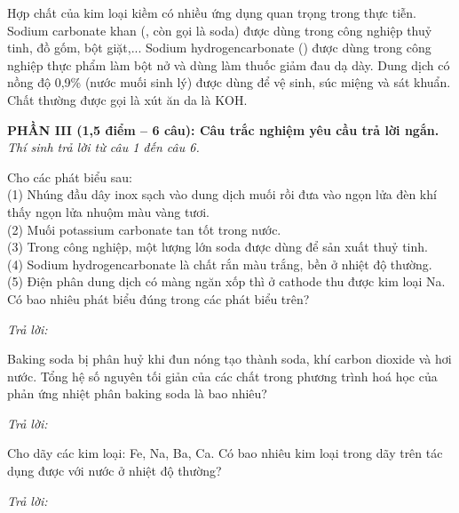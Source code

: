 \documentclass[11pt,a4paper]{article}
\def\loigiai#1{}
\begin{document}
\begin{ex}
Hợp chất của kim loại kiềm có nhiều ứng dụng quan trọng trong thực tiễn.
\choiceTF
{Sodium carbonate khan (, còn gọi là soda) được dùng trong công nghiệp thuỷ tinh, đồ gốm, bột giặt,...}
{Sodium hydrogencarbonate () được dùng trong công nghiệp thực phẩm làm bột nở và dùng làm thuốc giảm đau dạ dày.}
{Dung dịch  có nồng độ 0,9\% (nước muối sinh lý) được dùng để vệ sinh, súc miệng và sát khuẩn.}
{Chất thường được gọi là xút ăn da là KOH.}
\loigiai{}
\end{ex}

\newpage

\noindent
\textbf{PHẦN III (1,5 điểm -- 6 câu): Câu trắc nghiệm yêu cầu trả lời ngắn.}\\
\textit{Thí sinh trả lời từ câu 1 đến câu 6.}

\setcounter{ex}{0}

\begin{ex}
Cho các phát biểu sau:\\
(1) Nhúng đầu dây inox sạch vào dung dịch muối  rồi đưa vào ngọn lửa đèn khí thấy ngọn lửa nhuộm màu vàng tươi.\\
(2) Muối potassium carbonate tan tốt trong nước.\\
(3) Trong công nghiệp, một lượng lớn soda được dùng để sản xuất thuỷ tinh.\\
(4) Sodium hydrogencarbonate là chất rắn màu trắng, bền ở nhiệt độ thường.\\
(5) Điện phân dung dịch  có màng ngăn xốp thì ở cathode thu được kim loại Na.\\
Có bao nhiêu phát biểu đúng trong các phát biểu trên?
\par\noindent\textit{Trả lời:} \dotfill
\loigiai{}
\end{ex}

\begin{ex}
Baking soda bị phân huỷ khi đun nóng tạo thành soda, khí carbon dioxide và hơi nước. Tổng hệ số nguyên tối giản của các chất trong phương trình hoá học của phản ứng nhiệt phân baking soda là bao nhiêu?
\par\noindent\textit{Trả lời:} \dotfill
\loigiai{}
\end{ex}

\begin{ex}
Cho dãy các kim loại: Fe, Na, Ba, Ca. Có bao nhiêu kim loại trong dãy trên tác dụng được với nước ở nhiệt độ thường?
\par\noindent\textit{Trả lời:} \dotfill
\loigiai{}
\end{ex}
\end{document}
